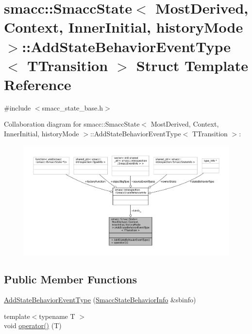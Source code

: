 \hypertarget{structsmacc_1_1SmaccState_1_1AddStateBehaviorEventType}{}\section{smacc\+:\+:Smacc\+State$<$ Most\+Derived, Context, Inner\+Initial, history\+Mode $>$\+:\+:Add\+State\+Behavior\+Event\+Type$<$ T\+Transition $>$ Struct Template Reference}
\label{structsmacc_1_1SmaccState_1_1AddStateBehaviorEventType}


{\ttfamily \#include $<$smacc\+\_\+state\+\_\+base.\+h$>$}



Collaboration diagram for smacc\+:\+:Smacc\+State$<$ Most\+Derived, Context, Inner\+Initial, history\+Mode $>$\+:\+:Add\+State\+Behavior\+Event\+Type$<$ T\+Transition $>$\+:
\nopagebreak
\begin{figure}[H]
\begin{center}
\leavevmode
\includegraphics[width=350pt]{structsmacc_1_1SmaccState_1_1AddStateBehaviorEventType__coll__graph}
\end{center}
\end{figure}
\subsection*{Public Member Functions}
\begin{DoxyCompactItemize}
\item 
\hyperlink{structsmacc_1_1SmaccState_1_1AddStateBehaviorEventType_a25000822bb8df2eae409afdc5ad1b090}{Add\+State\+Behavior\+Event\+Type} (\hyperlink{structsmacc_1_1introspection_1_1SmaccStateBehaviorInfo}{Smacc\+State\+Behavior\+Info} \&sbinfo)
\item 
{\footnotesize template$<$typename T $>$ }\\void \hyperlink{structsmacc_1_1SmaccState_1_1AddStateBehaviorEventType_ad20a68a7e420fd24cdd637bfd53e5315}{operator()} (T)
\end{DoxyCompactItemize}
